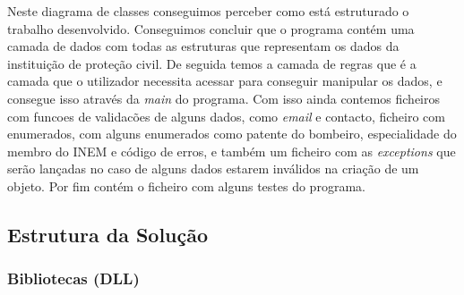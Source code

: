 \documentclass[11pt]{scrartcl} %
\begin{document}
Neste diagrama de classes conseguimos perceber como está estruturado o trabalho desenvolvido. Conseguimos concluir que o programa contém uma camada de dados com todas as estruturas que representam os dados da instituição de proteção civil. De seguida temos a camada de regras que é a camada que o utilizador necessita acessar para conseguir manipular os dados, e consegue isso através da \textit{main} do programa. Com isso ainda contemos ficheiros com funcoes de validacões de alguns dados, como \textit{email} e contacto, ficheiro com enumerados, com alguns enumerados como patente do bombeiro, especialidade do membro do INEM e código de erros, e também um ficheiro com as \textit{exceptions} que serão lançadas no caso de alguns dados estarem inválidos na criação de um objeto. Por fim contém o ficheiro com alguns testes do programa.

\subsection{Estrutura da Solução}

\subsubsection{Bibliotecas (DLL)}
\end{document}
